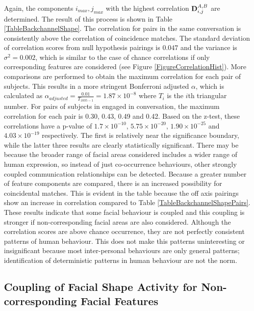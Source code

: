 Again, the components $i_{max}, j_{max}$ with the highest correlation $\textbf{D}^{A,B}_{i,j}$ are determined. The result of this process is shown in Table \ref{TableBackchannelShape}. The correlation for pairs in the same conversation is consistently above the correlation of coincidence matches. The standard deviation of correlation scores from null hypothesis pairings is $0.047$ and the variance is $\sigma^2=0.002$, which is similar to the case of chance correlations if only corresponding features are considered (see Figure \ref{FigureCorrelationHist}). More comparisons are performed to obtain the maximum correlation for each pair of subjects. This results in a more stringent Bonferroni adjusted $\alpha$, which is calculated as $\alpha_{adjusted} = \frac{0.01}{T_{1035-1}}=1.87\times10^{-8}$ where $T_i$ is the $i$th triangular number. For pairs of subjects in engaged in conversation, the maximum correlation for each pair is 0.30, 0.43, 0.49 and 0.42. Based on the z-test, these correlations have a p-value of $1.7\times10^{-10}$, $5.75\times10^{-20}$, $1.90\times10^{-25}$ and $4.03\times10^{-19}$ respectively. The first is relatively near the significance boundary, while the latter three results are clearly statistically significant. There may be because the broader range of facial areas considered includes a wider range of human expression, so instead of just co-occurrence behaviours, other strongly coupled communication relationships can be detected. Because a greater number of feature components are compared, there is an increased possibility for coincidental matches. This is evident in the table because the off axis pairings show an increase in correlation compared to Table \ref{TableBackchannelShapePairs}. These results indicate that some facial behaviour is coupled and this coupling is stronger if non-corresponding facial areas are also considered. Although the correlation scores are above chance occurrence, they are not perfectly consistent patterns of human behaviour. This does not make this patterns uninteresting or insignificant because most inter-personal behaviours are only general patterns; identification of deterministic patterns in human behaviour are not the norm.


\subsection{Coupling of Facial Shape Activity for Non-corresponding Facial Features}

